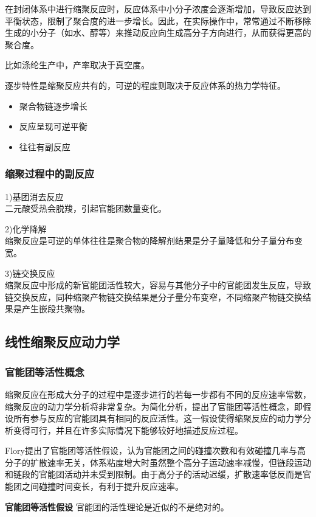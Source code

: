 ﻿\documentclass[12pt,a4paper]{article}
\begin{document}
在封闭体系中进行缩聚反应时，反应体系中小分子浓度会逐渐增加，导致反应达到平衡状态，限制了聚合度的进一步增长。因此，在实际操作中，常常通过不断移除生成的小分子（如水、醇等）来推动反应向生成高分子方向进行，从而获得更高的聚合度。

比如涤纶生产中，产率取决于真空度。

逐步特性是缩聚反应共有的，可逆的程度则取决于反应体系的热力学特征。
\begin{tcolorbox}[colframe=red, colback=yellow]
\begin{itemize}
  \item 聚合物链逐步增长
  \item 反应呈现可逆平衡
  \item 往往有副反应
\end{itemize}
\end{tcolorbox}
\subsubsection{缩聚过程中的副反应}
1)基团消去反应\\
二元酸受热会脱羧，引起官能团数量变化。

2)化学降解\\
缩聚反应是可逆的单体往往是聚合物的降解剂结果是分子量降低和分子量分布变宽。

3)链交换反应\\
缩聚反应中形成的新官能团活性较大，容易与其他分子中的官能团发生反应，导致链交换反应，同种缩聚产物链交换结果是分子量分布变窄，不同缩聚产物链交换结果是产生嵌段共聚物。
\subsection{线性缩聚反应动力学}
\subsubsection{官能团等活性概念}
缩聚反应在形成大分子的过程中是逐步进行的若每一步都有不同的反应速率常数，缩聚反应的动力学分析将非常复杂。为简化分析，提出了官能团等活性概念，即假设所有参与反应的官能团具有相同的反应活性。这一假设使得缩聚反应的动力学分析变得可行，并且在许多实际情况下能够较好地描述反应过程。

Flory提出了官能团等活性假设，认为官能团之间的碰撞次数和有效碰撞几率与高分子的扩散速率无关，体系粘度增大时虽然整个高分子运动速率减慢，但链段运动和链段的官能团活动并未受到限制。由于高分子的活动迟缓，扩散速率低反而是官能团之间碰撞时间变长，有利于提升反应速率。

{\bf{官能团等活性假设}} 官能团的活性理论是近似的不是绝对的。
\end{document}
